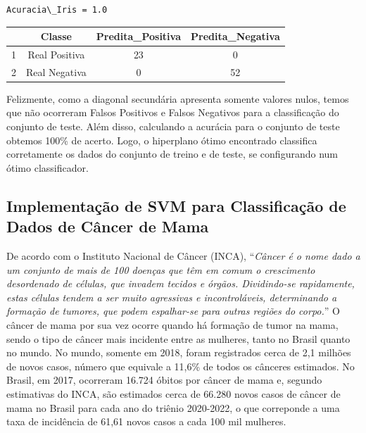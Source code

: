 \documentclass[12pt,a4paper]{scrartcl}
\theoremstyle{definition}%
\newcommand{\prompt}[4]{
        \ttfamily\llap{{\color{#2}[#3]:\hspace{3pt}#4}}\vspace{-\baselineskip}
    }
\begin{document}
    \begin{Verbatim}[commandchars=\\\{\}]
Acuracia\_Iris = 1.0
    \end{Verbatim}
 
{            
\prompt{Out}{outcolor}{25}{}
    
    \begin{tabular}{r|ccc}
    & Classe & Predita\_Positiva & Predita\_Negativa\\
    \hline
    
    1 & Real Positiva & 23 & 0 \\
    2 & Real Negativa & 0 & 52 \\
\end{tabular}
}

    

    Felizmente, como a diagonal secundária apresenta somente valores nulos,
temos que não ocorreram Falsos Positivos e Falsos Negativos para a
classificação do conjunto de teste. Além disso, calculando a acurácia
para o conjunto de teste obtemos 100\% de acerto. Logo, o hiperplano
ótimo encontrado classifica corretamente os dados do conjunto de treino
e de teste, se configurando num ótimo classificador.

    \hypertarget{implementauxe7uxe3o-de-svm-para-classificauxe7uxe3o-de-dados-de-cuxe2ncer-de-mama}{%
\subsection{Implementação de SVM para Classificação de Dados de Câncer
de
Mama}\label{implementauxe7uxe3o-de-svm-para-classificauxe7uxe3o-de-dados-de-cuxe2ncer-de-mama}}

    De acordo com o Instituto Nacional de Câncer (INCA), ``\emph{Câncer é o
nome dado a um conjunto de mais de 100 doenças que têm em comum o
crescimento desordenado de células, que invadem tecidos e órgãos.
Dividindo-se rapidamente, estas células tendem a ser muito agressivas e
incontroláveis, determinando a formação de tumores, que podem
espalhar-se para outras regiões do corpo.}'' O câncer de mama por sua
vez ocorre quando há formação de tumor na mama, sendo o tipo de câncer
mais incidente entre as mulheres, tanto no Brasil quanto no mundo. No
mundo, somente em 2018, foram registrados cerca de 2,1 milhões de novos
casos, número que equivale a 11,6\% de todos os cânceres estimados. No
Brasil, em 2017, ocorreram 16.724 óbitos por câncer de mama e, segundo
estimativas do INCA, são estimados cerca de 66.280 novos casos de câncer
de mama no Brasil para cada ano do triênio 2020-2022, o que correponde a
uma taxa de incidência de 61,61 novos casos a cada 100 mil mulheres.
\end{document}
